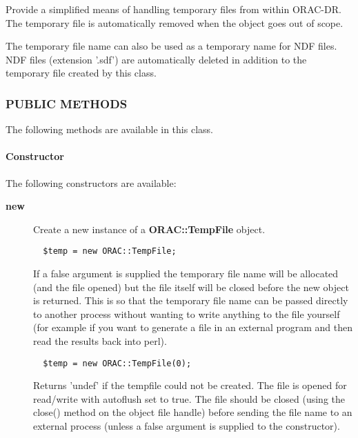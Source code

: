 \begin{description}
Provide a simplified means of handling temporary files from within
ORAC-DR. The temporary file is automatically removed when the
object goes out of scope.



The temporary file name can also be used as a temporary name for
NDF files. NDF files (extension '.sdf') are automatically deleted
in addition to the temporary file created by this class.

\subsubsection*{PUBLIC METHODS\label{ORAC::TempFile_PUBLIC_METHODS}}


The following methods are available in this class.

\paragraph*{Constructor\label{ORAC::TempFile_Constructor}}


The following constructors are available:

\begin{description}

\item[{\textbf{new}}] \mbox{}

Create a new instance of a \textbf{ORAC::TempFile} object.

\begin{verbatim}
  $temp = new ORAC::TempFile;
\end{verbatim}


If a false argument is supplied the temporary file
name will be allocated (and the file opened) but the
file itself will be closed before the new object is returned.
This is so that the temporary file name can be passed directly
to another process without wanting to write anything to the
file yourself (for example if you want to generate a file
in an external program and then read the results back into
perl).

\begin{verbatim}
  $temp = new ORAC::TempFile(0);
\end{verbatim}


Returns 'undef' if the tempfile could not be created.
The file is opened for read/write with autoflush set to true.
The file should be closed (using the close() method on the
object file handle) before sending the file name to an external
process (unless a false argument is supplied to the constructor).


\end{description}
\end{description}
